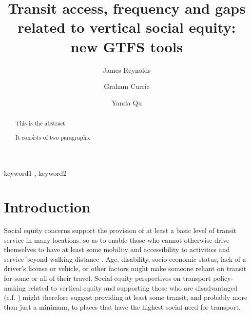 \documentclass[preprint, 3p,
authoryear]{elsarticle} %
\begin{document}
\begin{frontmatter}

  \title{Transit access, frequency and gaps related to vertical social
equity: new GTFS tools}
    \author[Public Transport Research Group (PTRG)]{James Reynolds%
  }
    \author[Public Transport Research Group (PTRG)]{Graham Currie%
  }
    \author[Public Transport Research Group (PTRG)]{Yanda Qu%
  }
  
  \begin{abstract}
  This is the abstract.

  It consists of two paragraphs.
  \end{abstract}
    \begin{keyword}
    keyword1 \sep 
    keyword2
  \end{keyword}
  
 \end{frontmatter}

\hypertarget{introduction}{%
\section{Introduction}\label{introduction}}

Social equity concerns support the provision of at least a basic level
of transit service in many locations, so as to enable those who cannot
otherwise drive themselves to have at least some mobility and
accessibility to activities and service beyond walking distance
\citep{Currie:2016aa}. Age, disability, socio-economic status, lack of a
driver's license or vehicle, or other factors might make someone reliant
on transit for some or all of their travel. Social-equity perspectives
on transport policy-making related to vertical equity and supporting
those who are disadvantaged (c.f. \citet{Litman:2016aa}) might therefore
suggest providing at least some transit, and probably more than just a
minimum, to places that have the highest social need for transport.
\end{document}
